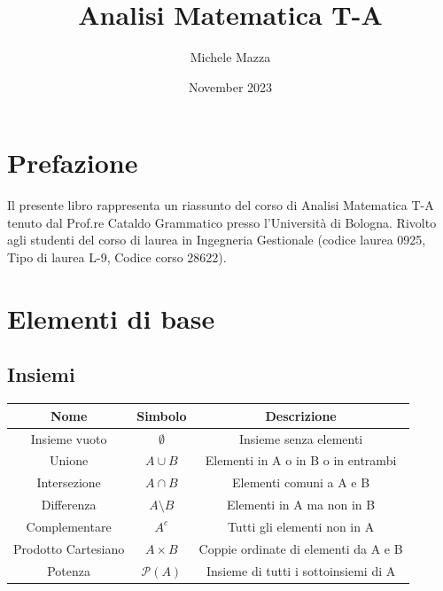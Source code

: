\documentclass{book}
\title{Analisi Matematica T-A}
\author{Michele Mazza}
\date{November 2023}
\begin{document}
\frontmatter
\maketitle
\tableofcontents

\chapter*{Prefazione}
Il presente libro rappresenta un riassunto del corso di Analisi Matematica T-A tenuto dal Prof.re Cataldo Grammatico presso l'Università di Bologna. Rivolto agli studenti del corso di laurea in Ingegneria Gestionale (codice laurea 0925, Tipo di laurea L-9, Codice corso 28622).

\mainmatter

\chapter{Elementi di base}

\section{Insiemi}
\begin{center}
    \begin{tabular}{|c|c|c|}
        \hline
        \rowcolor{lightblue}
        Nome                & Simbolo            & Descrizione                          \\
        \hline
        Insieme vuoto       & \(\emptyset\)      & Insieme senza elementi               \\
        Unione              & \(A \cup B\)       & Elementi in A o in B o in entrambi   \\
        Intersezione        & \(A \cap B\)       & Elementi comuni a A e B              \\
        Differenza          & \(A \setminus B\)  & Elementi in A ma non in B            \\
        Complementare       & \(A^c\)            & Tutti gli elementi non in A          \\
        Prodotto Cartesiano & \(A \times B\)     & Coppie ordinate di elementi da A e B \\
        Potenza             & \(\mathcal{P}(A)\) & Insieme di tutti i sottoinsiemi di A \\
        \hline
    \end{tabular}
\end{center}
\end{document}
